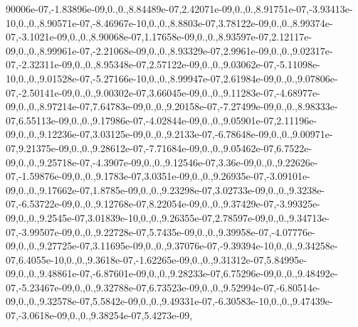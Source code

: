 {\-90006e-\/07,-\/1.\-83896e-\/09,0.,0.,8.\-84489e-\/07,2.\-42071e-\/09,0.,0.,8.\-91751e-\/07,-\/3.\-93413e-\/10,0.,0.,8.\-90571e-\/07,-\/8.\-46967e-\/10,0.,0.,8.\-8803e-\/07,3.\-78122e-\/09,0.,0.,8.\-99374e-\/07,-\/3.\-1021e-\/09,0.,0.,8.\-90068e-\/07,1.\-17658e-\/09,0.,0.,8.\-93597e-\/07,2.\-12117e-\/09,0.,0.,8.\-99961e-\/07,-\/2.\-21068e-\/09,0.,0.,8.\-93329e-\/07,2.\-9961e-\/09,0.,0.,9.\-02317e-\/07,-\/2.\-32311e-\/09,0.,0.,8.\-95348e-\/07,2.\-57122e-\/09,0.,0.,9.\-03062e-\/07,-\/5.\-11098e-\/10,0.,0.,9.\-01528e-\/07,-\/5.\-27166e-\/10,0.,0.,8.\-99947e-\/07,2.\-61984e-\/09,0.,0.,9.\-07806e-\/07,-\/2.\-50141e-\/09,0.,0.,9.\-00302e-\/07,3.\-66045e-\/09,0.,0.,9.\-11283e-\/07,-\/4.\-68977e-\/09,0.,0.,8.\-97214e-\/07,7.\-64783e-\/09,0.,0.,9.\-20158e-\/07,-\/7.\-27499e-\/09,0.,0.,8.\-98333e-\/07,6.\-55113e-\/09,0.,0.,9.\-17986e-\/07,-\/4.\-02844e-\/09,0.,0.,9.\-05901e-\/07,2.\-11196e-\/09,0.,0.,9.\-12236e-\/07,3.\-03125e-\/09,0.,0.,9.\-2133e-\/07,-\/6.\-78648e-\/09,0.,0.,9.\-00971e-\/07,9.\-21375e-\/09,0.,0.,9.\-28612e-\/07,-\/7.\-71684e-\/09,0.,0.,9.\-05462e-\/07,6.\-7522e-\/09,0.,0.,9.\-25718e-\/07,-\/4.\-3907e-\/09,0.,0.,9.\-12546e-\/07,3.\-36e-\/09,0.,0.,9.\-22626e-\/07,-\/1.\-59876e-\/09,0.,0.,9.\-1783e-\/07,3.\-0351e-\/09,0.,0.,9.\-26935e-\/07,-\/3.\-09101e-\/09,0.,0.,9.\-17662e-\/07,1.\-8785e-\/09,0.,0.,9.\-23298e-\/07,3.\-02733e-\/09,0.,0.,9.\-3238e-\/07,-\/6.\-53722e-\/09,0.,0.,9.\-12768e-\/07,8.\-22054e-\/09,0.,0.,9.\-37429e-\/07,-\/3.\-99325e-\/09,0.,0.,9.\-2545e-\/07,3.\-01839e-\/10,0.,0.,9.\-26355e-\/07,2.\-78597e-\/09,0.,0.,9.\-34713e-\/07,-\/3.\-99507e-\/09,0.,0.,9.\-22728e-\/07,5.\-7435e-\/09,0.,0.,9.\-39958e-\/07,-\/4.\-07776e-\/09,0.,0.,9.\-27725e-\/07,3.\-11695e-\/09,0.,0.,9.\-37076e-\/07,-\/9.\-39394e-\/10,0.,0.,9.\-34258e-\/07,6.\-4055e-\/10,0.,0.,9.\-3618e-\/07,-\/1.\-62265e-\/09,0.,0.,9.\-31312e-\/07,5.\-84995e-\/09,0.,0.,9.\-48861e-\/07,-\/6.\-87601e-\/09,0.,0.,9.\-28233e-\/07,6.\-75296e-\/09,0.,0.,9.\-48492e-\/07,-\/5.\-23467e-\/09,0.,0.,9.\-32788e-\/07,6.\-73523e-\/09,0.,0.,9.\-52994e-\/07,-\/6.\-80514e-\/09,0.,0.,9.\-32578e-\/07,5.\-5842e-\/09,0.,0.,9.\-49331e-\/07,-\/6.\-30583e-\/10,0.,0.,9.\-47439e-\/07,-\/3.\-0618e-\/09,0.,0.,9.\-38254e-\/07,5.\-4273e-\/09,}
